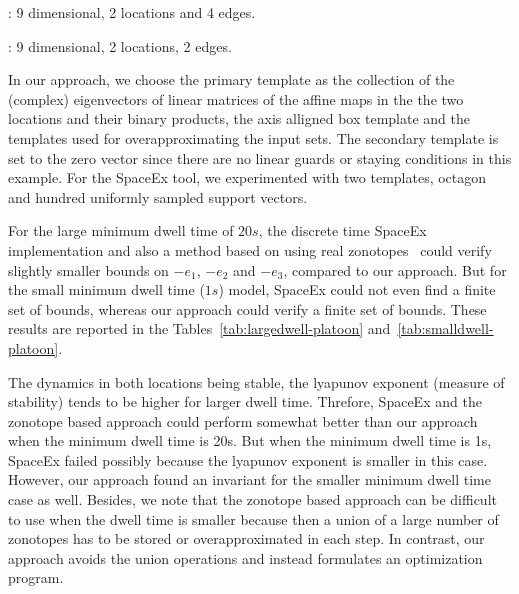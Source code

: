 : 9 dimensional, 2
locations and 4 edges.

: 9 dimensional, 2
locations, 2 edges.

  In our approach, we choose the primary template
as the collection of the (complex) eigenvectors of linear matrices of
the affine maps in the the two locations and their binary products,
the axis alligned box template and the templates used for
overapproximating the input sets.  The secondary template is set to
the zero vector since there are no linear guards or staying conditions
in this example.  For the SpaceEx tool, we experimented with two
templates, octagon and hundred uniformly sampled support vectors.

  For the large minimum dwell time of $20s$, the
discrete time SpaceEx implementation and also a method based on using
real zonotopes~\cite{makhlouf2014networked} could verify slightly
smaller bounds on $-e_1$, $-e_2$ and $-e_3$, compared to our approach.
But for the small minimum dwell time ($1s$) model, SpaceEx could not
even find a finite set of bounds, whereas our approach could verify a
finite set of bounds.  These results are reported in the
Tables~\ref{tab:largedwell-platoon} and~\ref{tab:smalldwell-platoon}.

  The dynamics in both locations being stable, the
lyapunov exponent (measure of stability) tends to be higher for larger
dwell time.  Threfore, SpaceEx and the zonotope based approach could
perform somewhat better than our approach when the minimum dwell time
is 20s.  But when the minimum dwell time is 1s, SpaceEx failed
possibly because the lyapunov exponent is smaller in this case.
However, our approach found an invariant for the smaller minimum dwell
time case as well.  Besides, we note that the zonotope based approach
can be difficult to use when the dwell time is smaller because then a
union of a large number of zonotopes has to be stored or
overapproximated in each step.  In contrast, our approach avoids the
union operations and instead formulates an optimization program.


